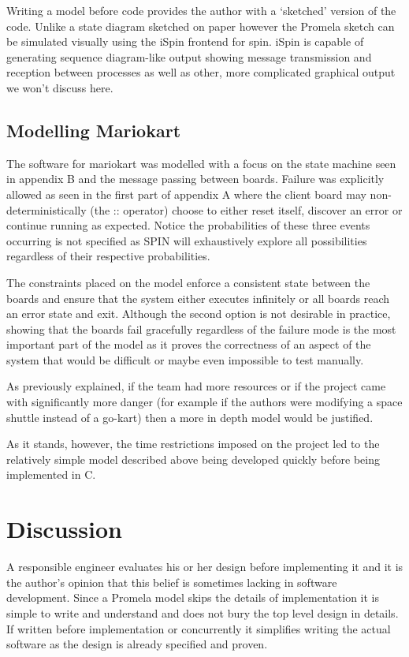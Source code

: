 Writing a model before code provides the author with a `sketched' version of 
the code. Unlike a state diagram sketched on paper however the Promela
sketch can be simulated visually using the iSpin frontend for spin. iSpin
is capable of generating sequence diagram-like output showing message transmission
and reception between processes as well as other, more complicated graphical output 
we won't discuss here.

\subsection{Modelling Mariokart}
The software for mariokart was modelled with a focus on the state machine seen in 
appendix B and the message passing between boards. Failure was explicitly allowed
as seen in the first part of appendix A where the client board may non-deterministically
(the :: operator) choose to either reset itself, discover an error or continue running as
expected. Notice the probabilities of these three events occurring is not specified
as SPIN will exhaustively explore all possibilities regardless of their respective probabilities.

The constraints placed on the model enforce a consistent state between
the boards and ensure that the system either executes infinitely or all boards reach an 
error state and exit. Although the second option is not desirable in practice, showing
that the boards fail gracefully regardless of the failure mode is the most important
part of the model as it proves the correctness of an aspect of the system that would
be difficult or maybe even impossible to test manually.

As previously explained, if the team had more resources or if the
project came with significantly more danger (for example if the authors were modifying
a space shuttle instead of a go-kart) then a more in depth model would be justified.

As it stands, however, the time restrictions imposed on the project led to the relatively simple
model described above being developed quickly before being implemented in C.


\section{Discussion}
A responsible engineer evaluates his or her design before implementing it and it is the author's opinion 
that this belief is sometimes lacking in software development. Since a Promela model skips
the details of implementation it is simple to write and understand and does not bury the top level design 
in details. If written before implementation or concurrently it simplifies writing the actual software 
as the design is already specified and proven.

